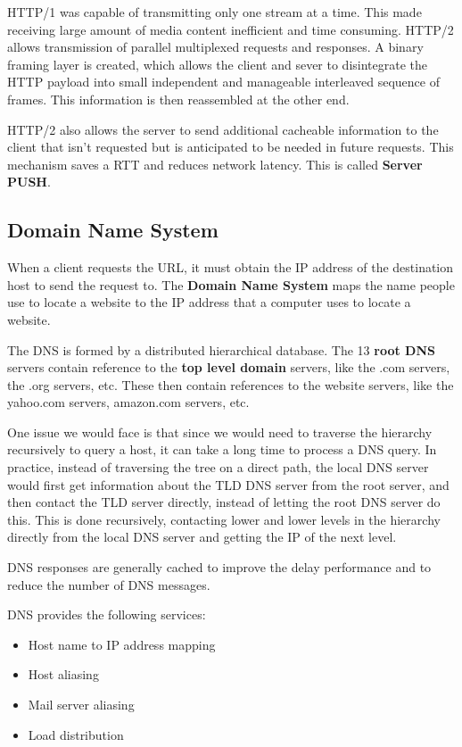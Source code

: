 \documentclass[12pt,letterpaper]{article}
\theoremstyle{definition}
\begin{document}
HTTP/1 was capable of transmitting only one stream at a time. This made receiving large amount of media content inefficient and time consuming. HTTP/2 allows transmission of parallel multiplexed requests and responses. A binary framing layer is created, which allows the client and sever to disintegrate the HTTP payload into small independent and manageable interleaved sequence of frames. This information is then reassembled at the other end.

HTTP/2 also allows the server to send additional cacheable information to the client that isn't requested but is anticipated to be needed in future requests. This mechanism saves a RTT and reduces network latency. This is called \textbf{Server PUSH}.

\subsection{Domain Name System}

When a client requests the URL, it must obtain the IP address of the destination host to send the request to. The \textbf{Domain Name System} maps the name people use to locate a website to the IP address that a computer uses to locate a website.

The DNS is formed by a distributed hierarchical database. The 13 \textbf{root DNS} servers contain reference to the \textbf{top level domain} servers, like the .com servers, the .org servers, etc. These then contain references to the website servers, like the yahoo.com servers, amazon.com servers, etc.

One issue we would face is that since we would need to traverse the hierarchy recursively to query a host, it can take a long time to process a DNS query. In practice, instead of traversing the tree on a direct path, the local DNS server would first get information about the TLD DNS server from the root server, and then contact the TLD server directly, instead of letting the root DNS server do this. This is done recursively, contacting lower and lower levels in the hierarchy directly from the local DNS server and getting the IP of the next level.

DNS responses are generally cached to improve the delay performance and to reduce the number of DNS messages.

DNS provides the following services:

\begin{itemize}
  \item Host name to IP address mapping
  \item Host aliasing
  \item Mail server aliasing
  \item Load distribution
\end{itemize}
\end{document}
